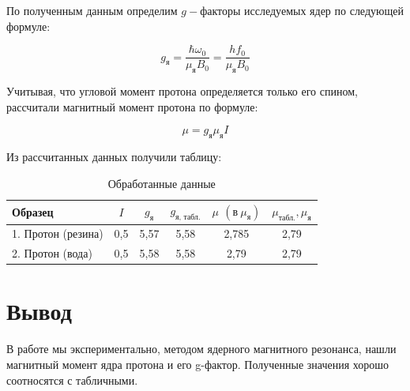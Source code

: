 \documentclass[a4paper,12pt]{article}
\begin{document}
		По полученным данным определим $g-$факторы исследуемых ядер по следующей формуле:
		
		\begin{equation}
		g_\text{я} = \frac{\hbar \omega_0}{\mu_\text{я} B_0} = \frac{h f_0}{\mu_\text{я} B_0}
		\end{equation}
		
		Учитывая, что угловой момент протона определяется только его спином, рассчитали магнитный момент протона по формуле:
		
		\begin{equation}
		\mu = g_\text{я} \mu_\text{я}I
		\end{equation}

		\newpage
		Из рассчитанных данных получили таблицу:
		
		
		\begin{table} [h]
			\centering
			\caption{Обработанные данные} 
			\begin{tabular}{|l||c|c|c|c|c|}
				\hline
				Образец & $I$ & $g_\text{я}$ & $g_\text{я, табл.}$ & $\mu$ $(\text{в} ~\mu_\text{я})$ & $ \mu_\text{табл.}, \mu_\text{я} $ \\
				\hline
				1. Протон (резина)  & 0,5 & 5,57 & 5,58 & 2,785 & 2,79  \\
				\hline
				2. Протон (вода)& 0,5 & 5,58 & 5,58 & 2,79 & 2,79  \\
				\hline
			\end{tabular}
		\end{table}
	
		\section*{Вывод}
		
		В работе мы экспериментально, методом ядерного магнитного резонанса, нашли магнитный момент ядра протона и его g-фактор. Полученные значения хорошо соотносятся с табличными.
\end{document}

